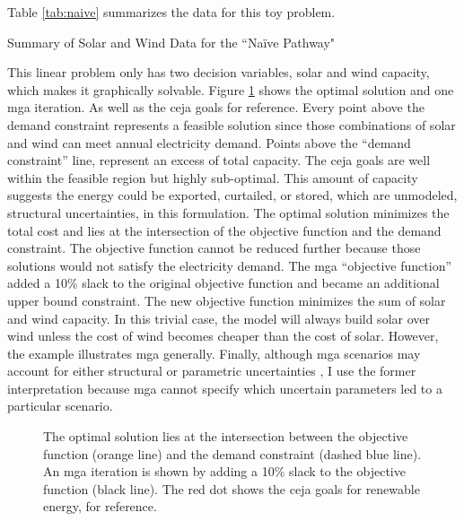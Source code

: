 Table \ref{tab:naive} summarizes the data for this toy problem.

\begin{table}[H]
  \centering
  \caption{Summary of Solar and Wind Data for the ``Na\"{i}ve Pathway"}
  \label{tab:naive}
  \resizebox{0.75\textwidth}{!}{
  
  }
\end{table}

This linear problem only has two decision variables, solar and wind capacity,
which makes it graphically solvable. Figure \ref{fig:mga-fig} shows the optimal
solution and one \gls{mga} iteration. As well as the \gls{ceja} goals for reference.
Every point above the demand constraint represents a feasible solution since those
combinations of solar and wind can meet annual electricity demand.
Points above the ``demand constraint'' line, represent an excess of total capacity. 
The \gls{ceja} goals are well within the feasible region but highly sub-optimal.
This amount of capacity suggests the energy could be exported, curtailed, or stored,
which are unmodeled, structural uncertainties, in this formulation.
The optimal solution minimizes the total cost and lies at the intersection
of the objective function and the demand constraint. The objective function cannot
be reduced further because those solutions would not satisfy the electricity demand.
The \gls{mga} ``objective function'' added a 10\% slack to the original objective
function and became an additional upper bound constraint. The new objective function
minimizes the sum of solar and wind capacity. In this trivial case, the model will
always build solar over wind unless the cost of wind becomes cheaper than the cost of
solar. However, the example illustrates \gls{mga} generally. Finally, although \gls{mga}
scenarios may account for either structural or parametric uncertainties
\cite{decarolis_modelling_2016}, I use the former interpretation because
\gls{mga} cannot specify which uncertain parameters led to a particular scenario.
\begin{figure}[H]
  \centering
  \resizebox{0.8\columnwidth}{!}{}
  \caption{The optimal solution lies at the intersection between the objective
  function (orange line) and the demand constraint (dashed blue line). An \gls{mga}
  iteration is shown by adding a 10\% slack to the objective function (black line).
  The red dot shows the \gls{ceja} goals for renewable energy, for reference.}
  \label{fig:mga-fig}
\end{figure}

